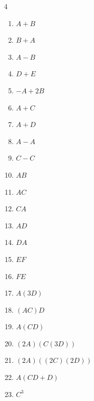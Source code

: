    \begin{multicols}{4}
        \begin{enumerate}[label=\Alph*)]
            \item $A+B$
            \item $B+A$
            \item $A-B$
            \item $D+E$
            \item $-A+2B$
            \item $A+C$
            \item $A+D$
            \item $A-A$
            \item $C-C$
            \item $AB$
            \item $AC$
            \item $CA$
            \item $AD$
            \item $DA$
            \item $EF$
            \item $FE$
            \item $A(3D)$
            \item $(AC)D$
            \item $A(CD)$
            \item $(2A)(C(3D))$
            \item $(2A)((2C)(2D))$
            \item $A(CD+D)$
            \item $C^3$
        \end{enumerate}
        \end{multicols}
